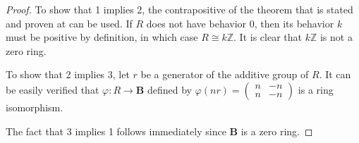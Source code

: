 \documentclass[12pt]{article}
\begin{document}
\begin{proof}
To show that 1 implies 2, the contrapositive of the theorem that is stated and proven at  can be used.  If $R$ does not have behavior $0$, then its behavior $k$ must be positive by definition, in which case $R \cong k\mathbb{Z}$.  It is clear that $k\mathbb{Z}$ is not a zero ring.

To show that 2 implies 3, let $r$ be a generator of the additive group of $R$.  It can be easily verified that $\varphi \colon R \to \mathbf{B}$ defined by $\displaystyle \varphi(nr)=\left( \begin{array}{cc}
n & -n \\
n & -n \end{array} \right)$ is a ring isomorphism.

The fact that 3 implies 1 follows immediately since $\mathbf{B}$ is a zero ring.
\end{proof}
\end{document}
